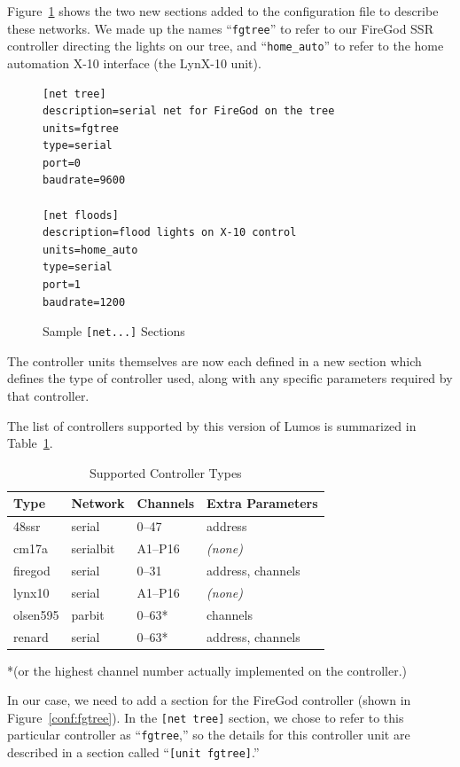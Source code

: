 \documentclass{article}
\begin{document}
Figure~\ref{conf:nets} shows the two new sections added to the configuration
file to describe these networks.  We made up the names ``{\tt fgtree}'' to refer to
our FireGod SSR controller directing the lights on our tree, and
``\verb+home_auto+'' to refer to the home automation X-10 interface (the LynX-10
unit).

\begin{figure}[htbp]
\begin{verbatim}
[net tree]
description=serial net for FireGod on the tree
units=fgtree
type=serial
port=0
baudrate=9600

[net floods]
description=flood lights on X-10 control
units=home_auto
type=serial
port=1
baudrate=1200
\end{verbatim}
\caption{Sample {\tt[net...]} Sections}
\label{conf:nets}
\end{figure}

The controller units themselves are now each defined in a new section which
defines the type of controller used, along with any specific parameters
required by that controller.

The list of controllers supported by this version of Lumos is summarized in
Table~\ref{conf:controllers}.  

\begin{table}[htbp]
\begin{center}
\begin{tabular}{|l|l|l|l|}\hline
\bf Type   & \bf Network   & \bf Channels & \bf Extra Parameters \\\hline\hline
48ssr      & serial        & 0--47        & address\\\hline
cm17a      & serialbit     & A1--P16      & {\it(none)}\\\hline
firegod    & serial        & 0--31        & address, channels\\\hline
lynx10     & serial        & A1--P16      & {\it(none)}\\\hline
olsen595   & parbit        & 0--63*       & channels\\\hline
renard     & serial        & 0--63*       & address, channels\\\hline
\end{tabular}
\end{center}
*(or the highest channel number actually implemented on the controller.)
\caption{Supported Controller Types}
\label{conf:controllers}
\end{table}

In our case, we need to add a section for the FireGod controller (shown in
Figure~\ref{conf:fgtree}).  In the {\tt[net~tree]} section, we chose to refer 
to this particular controller as ``{\tt fgtree},'' so the details for this
controller unit are described in a section called ``{\tt[unit fgtree]}.''
\end{document}
